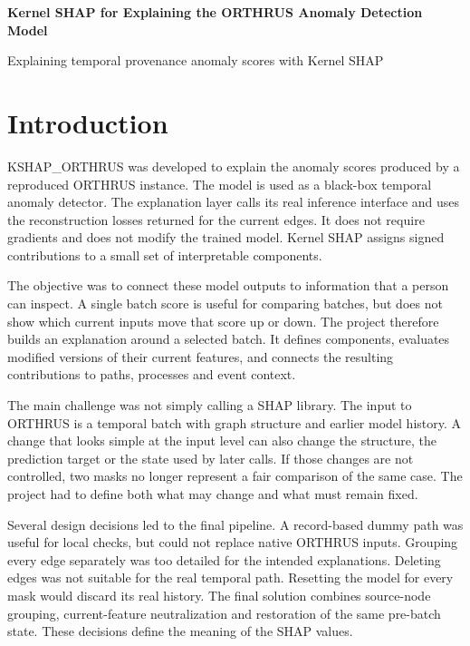 \documentclass[11pt,a4paper]{article}
\begin{document}
{\LARGE\bfseries Kernel SHAP for Explaining the ORTHRUS Anomaly Detection Model\par}
\vspace{3mm}
{\large Explaining temporal provenance anomaly scores with Kernel SHAP\par}
\vspace{4mm}

\section{Introduction}
KSHAP\_ORTHRUS was developed to explain the anomaly scores produced by a
reproduced ORTHRUS instance. The model is used as a black-box temporal anomaly
detector. The explanation layer calls its real inference interface and uses
the reconstruction losses returned for the current edges. It does not require
gradients and does not modify the trained model. Kernel SHAP assigns signed
contributions to a small set of interpretable components.

The objective was to connect these model outputs to information that a person
can inspect. A single batch score is useful for comparing batches, but does not
show which current inputs move that score up or down. The project therefore
builds an explanation around a selected batch. It defines components, evaluates
modified versions of their current features, and connects the resulting
contributions to paths, processes and event context.

The main challenge was not simply calling a SHAP library. The input to ORTHRUS
is a temporal batch with graph structure and earlier model history. A change
that looks simple at the input level can also change the structure, the
prediction target or the state used by later calls. If those changes are not
controlled, two masks no longer represent a fair comparison of the same case.
The project had to define both what may change and what must remain fixed.

Several design decisions led to the final pipeline. A record-based dummy path
was useful for local checks, but could not replace native ORTHRUS inputs.
Grouping every edge separately was too detailed for the intended explanations.
Deleting edges was not suitable for the real temporal path. Resetting the model
for every mask would discard its real history. The final solution combines
source-node grouping, current-feature neutralization and restoration of the
same pre-batch state. These decisions define the meaning of the SHAP values.
\end{document}
